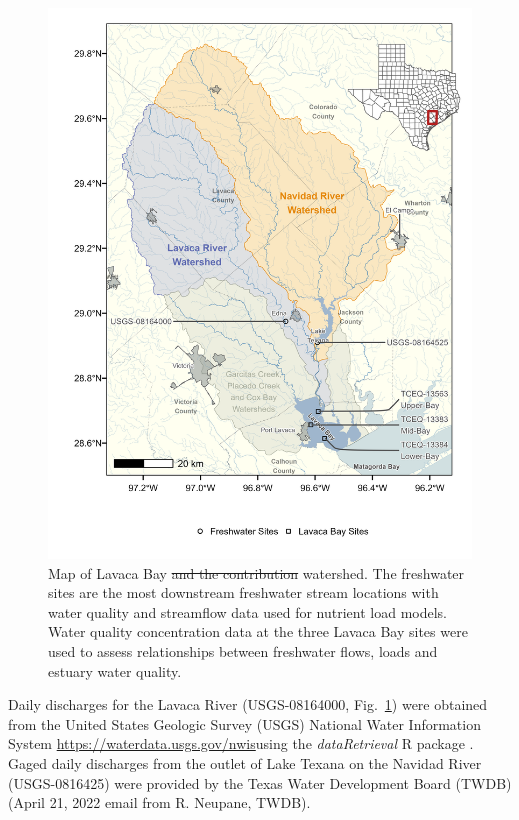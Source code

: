 \documentclass[fleqn,10pt,lineno]{wlpeerj} %
\providecommand{\DIFaddtex}[1]{{\protect\color{blue}\uwave{#1}}} %
\providecommand{\DIFdeltex}[1]{{\protect\color{red}\sout{#1}}}                      %
\providecommand{\DIFaddbegin}{} %
\providecommand{\DIFaddend}{} %
\providecommand{\DIFdelFL}[1]{\DIFdel{#1}} %
\providecommand{\DIFaddbeginFL}{} %
\providecommand{\DIFaddendFL}{} %
\providecommand{\DIFdelbeginFL}{} %
\providecommand{\DIFdelendFL}{} %
\providecommand{\DIFadd}[1]{\texorpdfstring{\DIFaddtex{#1}}{#1}} %
\providecommand{\DIFdel}[1]{\texorpdfstring{\DIFdeltex{#1}}{}} %
\begin{document}
\begin{figure}

{\centering \DIFdelbeginFL %
\DIFdelendFL \DIFaddbeginFL \includegraphics[width=5.2in,]{Schramm-2023-08-PeerJ_files/figure-latex/fig1} 
\DIFaddendFL 

}

\caption{Map of Lavaca Bay \DIFdelbeginFL \DIFdelFL{and the contribution }\DIFdelendFL watershed. The freshwater sites are the most downstream freshwater stream locations with water quality and streamflow data used for nutrient load models. Water quality concentration data at the three Lavaca Bay sites were used to assess relationships between freshwater flows, loads and estuary water quality.}\label{fig:fig1}
\end{figure}

Daily discharges for the Lavaca River (USGS-08164000,
Fig.~\ref{fig:fig1}) were obtained from the United States Geologic
Survey (USGS) National Water Information System
\DIFaddbegin \DIFadd{(}\url{https://waterdata.usgs.gov/nwis}\DIFadd{) }\DIFaddend using the \emph{dataRetrieval} R
package \autocite{deciccoDataRetrievalPackagesDiscovering2022}. Gaged
daily discharges from the outlet of Lake Texana on the Navidad River
(USGS-0816425) were provided by the Texas Water Development Board (TWDB)
(April 21, 2022 email from R. Neupane, TWDB).
\end{document}
